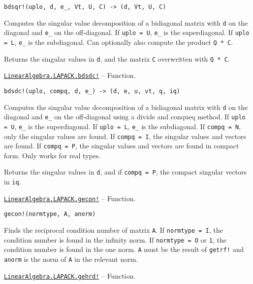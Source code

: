 \begin{adjustwidth}{2em}{0pt}


\begin{verbatim}
bdsqr!(uplo, d, e_, Vt, U, C) -> (d, Vt, U, C)
\end{verbatim}

Computes the singular value decomposition of a bidiagonal matrix with \texttt{d} on the diagonal and \texttt{e\_} on the off-diagonal. If \texttt{uplo = U}, \texttt{e\_} is the superdiagonal. If \texttt{uplo = L}, \texttt{e\_} is the subdiagonal. Can optionally also compute the product \texttt{Q{\textquotesingle} * C}.

Returns the singular values in \texttt{d}, and the matrix \texttt{C} overwritten with \texttt{Q{\textquotesingle} * C}.



\end{adjustwidth}
\hypertarget{2117266507846761835}{} 
\hyperlink{2117266507846761835}{\texttt{LinearAlgebra.LAPACK.bdsdc!}}  -- {Function.}

\begin{adjustwidth}{2em}{0pt}


\begin{verbatim}
bdsdc!(uplo, compq, d, e_) -> (d, e, u, vt, q, iq)
\end{verbatim}

Computes the singular value decomposition of a bidiagonal matrix with \texttt{d} on the diagonal and \texttt{e\_} on the off-diagonal using a divide and conqueq method. If \texttt{uplo = U}, \texttt{e\_} is the superdiagonal. If \texttt{uplo = L}, \texttt{e\_} is the subdiagonal. If \texttt{compq = N}, only the singular values are found. If \texttt{compq = I}, the singular values and vectors are found. If \texttt{compq = P}, the singular values and vectors are found in compact form. Only works for real types.

Returns the singular values in \texttt{d}, and if \texttt{compq = P}, the compact singular vectors in \texttt{iq}.



\end{adjustwidth}
\hypertarget{3277861361503147277}{} 
\hyperlink{3277861361503147277}{\texttt{LinearAlgebra.LAPACK.gecon!}}  -- {Function.}

\begin{adjustwidth}{2em}{0pt}


\begin{verbatim}
gecon!(normtype, A, anorm)
\end{verbatim}

Finds the reciprocal condition number of matrix \texttt{A}. If \texttt{normtype = I}, the condition number is found in the infinity norm. If \texttt{normtype = O} or \texttt{1}, the condition number is found in the one norm. \texttt{A} must be the result of \texttt{getrf!} and \texttt{anorm} is the norm of \texttt{A} in the relevant norm.



\end{adjustwidth}
\hypertarget{14367369116295032587}{} 
\hyperlink{14367369116295032587}{\texttt{LinearAlgebra.LAPACK.gehrd!}}  -- {Function.}

